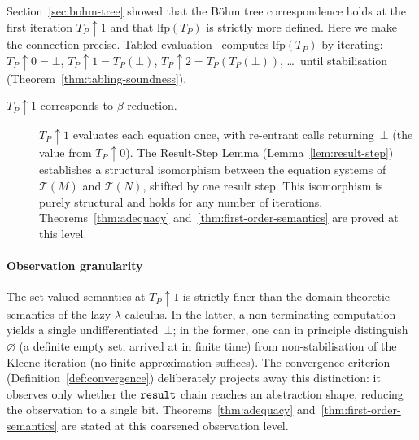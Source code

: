 \begin{remark}
  \label{rem:convergence-lfp}
  Section~\ref{sec:bohm-tree} showed that the B\"ohm tree
  correspondence holds at the first iteration
  $T_P\!\uparrow\!1$ and that $\mathrm{lfp}(T_P)$ is
  strictly more defined.
  Here we make the connection precise.
  Tabled evaluation~\cite{tamaki1986-tabled-resolution}
  computes $\mathrm{lfp}(T_P)$ by iterating:
  $T_P\!\uparrow\!0 = \bot$,
  $T_P\!\uparrow\!1 = T_P(\bot)$,
  $T_P\!\uparrow\!2 = T_P(T_P(\bot))$,
  \ldots\ until stabilisation
  (Theorem~\ref{thm:tabling-soundness}).

  \begin{description}
    \item[$T_P\!\uparrow\!1$ corresponds to
      $\beta$-reduction.]
      $T_P\!\uparrow\!1$ evaluates each equation once,
      with re-entrant calls returning~$\bot$
      (the value from $T_P\!\uparrow\!0$).
      The Result-Step Lemma
      (Lemma~\ref{lem:result-step}) establishes a
      structural isomorphism between the equation
      systems of $\mathcal{T}(M)$ and
      $\mathcal{T}(N)$, shifted by one
      $\mathrm{result}$ step.
      This isomorphism is purely structural and holds
      for any number of iterations.
      Theorems~\ref{thm:adequacy}
      and~\ref{thm:first-order-semantics}
      are proved at this level.
  \end{description}

  \paragraph{Observation granularity}%
  \label{rem:set-vs-domain}
  The set-valued semantics at $T_P\!\uparrow\!1$ is
  strictly finer than the domain-theoretic semantics of
  the lazy $\lambda$-calculus.
  In the latter, a non-terminating computation yields a
  single undifferentiated~$\bot$;
  in the former, one can in principle distinguish
  $\varnothing$ (a definite empty set, arrived at in
  finite time) from non-stabilisation of the Kleene
  iteration (no finite approximation suffices).
  The convergence criterion
  (Definition~\ref{def:convergence}) deliberately
  projects away this distinction: it observes only
  whether the $\mathtt{result}$ chain reaches an abstraction
  shape, reducing the observation to a single bit.
  Theorems~\ref{thm:adequacy}
  and~\ref{thm:first-order-semantics}
  are stated at this coarsened observation level.


\end{remark}
